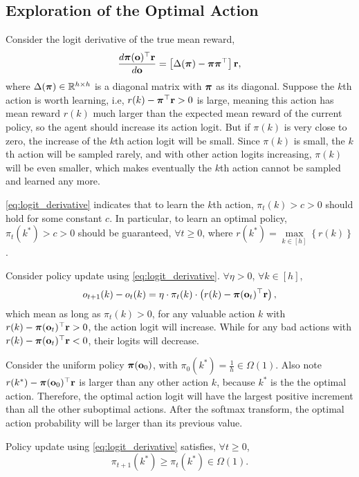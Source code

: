 \iffalse
\subsection{Exploration of the Optimal Action}
\label{subsec:exploration_in_policy_learning}

Consider the logit derivative of the true mean reward,
\begin{equation}
\label{eq:logit_derivative}
\begin{split}
    \frac{d {\boldsymbol{\pi}}( {\mathbf{o}})^\top {\mathbf{r}}}{d {\mathbf{o}}} = \left[ \Delta({\boldsymbol{\pi}}) - {\boldsymbol{\pi}} {\boldsymbol{\pi}}^\top \right] {\mathbf{r}},
\end{split}
\end{equation}
where $\Delta({\boldsymbol{\pi}}) \in {\mathbb{R}}^{h \times h}$ is a diagonal matrix with ${\boldsymbol{\pi}}$ as its diagonal. Suppose the $k$th action is worth learning, i.e, $r(k) - {\boldsymbol{\pi}}^\top {\mathbf{r}} > 0$ is large, meaning this action has mean reward $r(k)$ much larger than the expected mean reward of the current policy, so the agent should increase its action logit. But if $\pi(k)$ is very close to zero, the increase of the $k$th action logit will be small. Since $\pi(k)$ is small, the $k$th action will be sampled rarely, and with other action logits increasing, $\pi(k)$ will be even smaller, which makes eventually the $k$th action cannot be sampled and learned any more.

\cref{eq:logit_derivative} indicates that to learn the $k$th action, $\pi_{t}(k) > c > 0$ should hold for some constant $c$. In particular, to learn an optimal policy, $\pi_{t}(k^*) > c > 0$ should be guaranteed, $\forall t \ge 0$, where $r(k^*) = \max\limits_{k \in \left[ h \right]}\left\{ r(k) \right\}$.

Consider policy update using \cref{eq:logit_derivative}. $\forall \eta > 0$, $\forall k \in [h]$,
\begin{equation*}
\label{eq:logit_increment_logit_space}
\begin{split}
\small
    o_{t+1}(k) - o_{t}(k) = \eta \cdot \pi_{t}(k) \cdot \left( r(k) - \rvpi(\rvo_{t})^\top \rvr \right),
\end{split}
\end{equation*}
which mean as long as $\pi_{t}(k) > 0$, for any valuable action $k$ with $r(k) -  {\boldsymbol{\pi}}({\mathbf{o}}_{t})^\top {\mathbf{r}} > 0$, the action logit will increase. While for any bad actions with $r(k) -  {\boldsymbol{\pi}}({\mathbf{o}}_{t})^\top {\mathbf{r}} < 0$, their logits will decrease.

Consider the uniform policy ${\boldsymbol{\pi}}( {\mathbf{o}}_0)$, with $\pi_{0}(k^*) = \frac{1}{h} \in \Omega(1)$. Also note $r(k^*) - {\boldsymbol{\pi}}( {\mathbf{o}}_0)^\top {\mathbf{r}}$ is larger than any other action $k$, because $k^*$ is the the optimal action. Therefore, the optimal action logit will have the largest positive increment than all the other suboptimal actions. After the softmax transform, the optimal action probability will be larger than its previous value. 
\begin{lem}
\label{lem:optimal_probability_increse_logit_space}
Policy update using \cref{eq:logit_derivative} satisfies, $\forall t \ge 0$,
\begin{equation*}
    \pi_{t+1}(k^*) \ge \pi_{t}(k^*) \in \Omega(1).
\end{equation*}
\end{lem}

